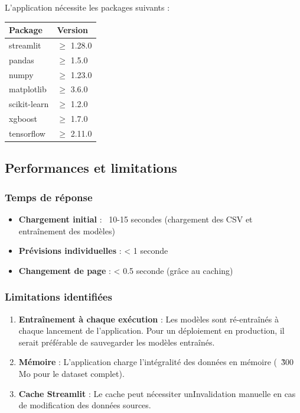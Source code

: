 \documentclass[12pt,a4paper]{article}
\begin{document}
L'application nécessite les packages suivants :

\begin{table}[H]
\centering
\begin{tabular}{@{}ll@{}}
\toprule
\textbf{Package} & \textbf{Version} \\ \midrule
streamlit & $\geq$ 1.28.0 \\
pandas & $\geq$ 1.5.0 \\
numpy & $\geq$ 1.23.0 \\
matplotlib & $\geq$ 3.6.0 \\
scikit-learn & $\geq$ 1.2.0 \\
xgboost & $\geq$ 1.7.0 \\
tensorflow & $\geq$ 2.11.0 \\ \bottomrule
\end{tabular}
\end{table}

\subsection{Performances et limitations}

\subsubsection{Temps de réponse}

\begin{itemize}[leftmargin=*]
    \item \textbf{Chargement initial} : ~10-15 secondes (chargement des CSV et entraînement des modèles)
    \item \textbf{Prévisions individuelles} : < 1 seconde
    \item \textbf{Changement de page} : < 0.5 seconde (grâce au caching)
\end{itemize}

\subsubsection{Limitations identifiées}

\begin{enumerate}
    \item \textbf{Entraînement à chaque exécution} : Les modèles sont ré-entraînés à chaque lancement de l'application. Pour un déploiement en production, il serait préférable de sauvegarder les modèles entraînés.
    \item \textbf{Mémoire} : L'application charge l'intégralité des données en mémoire (~\~300 Mo pour le dataset complet).
    \item \textbf{Cache Streamlit} : Le cache peut nécessiter unInvalidation manuelle en cas de modification des données sources.
\end{enumerate}
\end{document}
